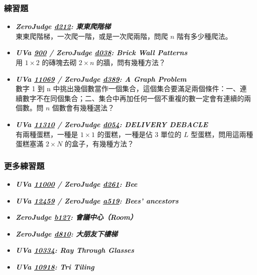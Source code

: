 \subsubsection*{練習題}
\begin{itemize}[label={\Checkmark}]
\item \textbf{\textit{ZeroJudge \href{http://zerojudge.tw/ShowProblem?problemid=d212}{d212}: 東東爬階梯}}\\
東東爬階梯，一次爬一階，或是一次爬兩階，問爬 $n$ 階有多少種爬法。
\item \textbf{\textit{UVa \href{http://uva.onlinejudge.org/external/9/900.html}{900} / ZeroJudge \href{http://zerojudge.tw/ShowProblem?problemid=d038}{d038}: Brick Wall Patterns}}\\
用 $1\times{2}$ 的磚塊去砌 $2\times{n}$ 的牆，問有幾種方法？
\item \textbf{\textit{UVa \href{http://uva.onlinejudge.org/external/110/11069.html}{11069} / ZeroJudge \href{http://zerojudge.tw/ShowProblem?problemid=d389}{d389}: A Graph Problem}}\\
數字 1 到 n 中挑出幾個數當作一個集合，這個集合要滿足兩個條件：一、連續數字不在同個集合；二、集合中再加任何一個不重複的數一定會有連續的兩個數。問 $n$ 個數會有幾種選法？
\item \textbf{\textit{UVa \href{http://uva.onlinejudge.org/external/113/11310.html}{11310} / ZeroJudge \href{http://zerojudge.tw/ShowProblem?problemid=d054}{d054}: DELIVERY DEBACLE}}\\
有兩種蛋糕，一種是 $1\times{1}$ 的蛋糕，一種是佔 $3$ 單位的 $L$ 型蛋糕，問用這兩種蛋糕塞滿 $2\times{N}$ 的盒子，有幾種方法？
\end{itemize}
\subsubsection*{更多練習題}
\begin{itemize}[label={\PencilLeftDown}]
\item \textbf{\textit{UVa \href{http://uva.onlinejudge.org/external/110/11000.html}{11000} / ZeroJudge \href{http://zerojudge.tw/ShowProblem?problemid=d261}{d261}: Bee}}
\item \textbf{\textit{UVa \href{http://uva.onlinejudge.org/external/124/12459.html}{12459} / ZeroJudge \href{http://zerojudge.tw/ShowProblem?problemid=a519}{a519}: Bees' ancestors}}
\item \textbf{\textit{ZeroJudge \href{http://zerojudge.tw/ShowProblem?problemid=b127}{b127}: 會議中心（Room）}}
\item \textbf{\textit{ZeroJudge \href{http://zerojudge.tw/ShowProblem?problemid=d810}{d810}: 大朋友下樓梯}}
\item \textbf{\textit{UVa \href{http://uva.onlinejudge.org/external/103/10334.html}{10334}: Ray Through Glasses}}
\item \textbf{\textit{UVa \href{http://uva.onlinejudge.org/external/109/10918.html}{10918}: Tri Tiling}}
\end{itemize}